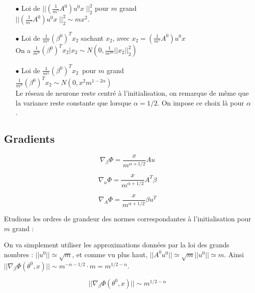 \documentclass[a4paper, 11pt, french]{article}
\theoremstyle{definition}
\begin{document}
\begin{itemize}
		\item[$\bullet$] Loi de $ || \left(\frac{1}{m^{\gamma}} A^0 \right) u^0 x \; ||_2^2 $ pour $m$ grand \\

		$||\left(\frac{1}{m^{\gamma}} A^0 \right) u^0 x \; ||_2^2 \sim m x^2$. \\

		\item[$\bullet$] Loi de $ \frac{1}{m^{\alpha}} (\beta^0)^T x_2 $ sachant $x_2$, avec 
		$x_2 = \left(\frac{1}{m^{\gamma}} A^0 \right) u^0 x$ \\
		
		On a 
		$ \frac{1}{m^{\alpha}} (\beta^0)^T x_2 | x_2 \sim N(0,  \frac{1}{m^{2\alpha}}||x_2||_2^2) $
		\\
		
		\item[$\bullet$] Loi de $ \frac{1}{m^{\alpha}} (\beta^0)^T x_2 $ pour $m$ grand\\
		
		$ \frac{1}{m^{\alpha}} (\beta^0)^T x_2 \sim N(0,  x^2 m^{1 - 2\alpha}) $
		\\
		
		Le réseau de neurone reste centré à l'initialisation, on remarque de même que la variance reste constante que lorsque $\alpha = 1/2$. On impose ce choix là pour $\alpha$.
		
	\end{itemize}

	\subsection{Gradients}
	
	
	
	\[\nabla_{\beta} \Phi = \frac{x}{m^{\alpha + 1/2}} A u\]
	
	\[\nabla_u \Phi = \frac{x}{m^{\alpha + 1/2}} A^T \beta\]

	\[\nabla_A \Phi = \frac{x}{m^{\alpha + 1/2}} \beta u^T\]
	
	Etudions les ordres de grandeur des normes correspondantes à l'initialisation pour $m$ grand :
	
	On va simplement utiliser les approximations données par la loi des grands nombres :
	 $||u^0|| \simeq \sqrt{m}$, et comme vu plus haut, 
	 $||A^0 u^0|| \simeq \sqrt{m}||u^0|| \simeq m$. Ainsi $||\nabla_{\beta} \Phi (\theta^0, x)|| \sim m^{-\alpha - 1/2} \cdot m = m^{1/2 - \alpha}$.
	 
	 \[||\nabla_{\beta} \Phi (\theta^0, x)|| \sim m^{1/2 - \alpha}\]
	 
\end{document}
